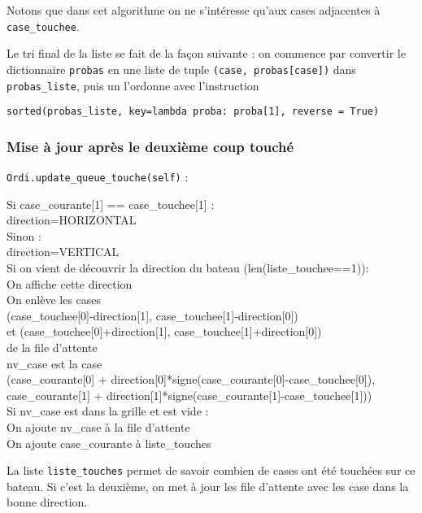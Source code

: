 Notons que dans cet algorithme on ne s'intéresse qu'aux cases adjacentes à \texttt{case\_touchee}.

\medskip

Le tri final de la liste se fait de la façon suivante : on commence par convertir le dictionnaire \texttt{probas} en une liste de tuple \texttt{(case, probas[case])} dans \texttt{probas\_liste}, puis un l'ordonne avec l'instruction
\begin{center}
\texttt{sorted(probas\_liste, key=lambda proba: proba[1], reverse = True)}
\end{center}

\newpage
\subsubsection{Mise à jour après le deuxième coup touché}\label{update_queue_touche}
\texttt{Ordi.update\_queue\_touche(self)} :
\begin{algo1}
Si case\_courante[1] == case\_touchee[1] :\\
direction=HORIZONTAL\\
Sinon :\\
direction=VERTICAL\\
Si on vient de découvrir la direction du bateau (len(liste\_touchee==1)):\\
On affiche cette direction\\
On enlève les cases \\
 (case\_touchee[0]-direction[1], case\_touchee[1]-direction[0])\\ 
et (case\_touchee[0]+direction[1], case\_touchee[1]+direction[0])\\
de la file d'attente\\
nv\_case est la case\\
(case\_courante[0] + direction[0]*signe(case\_courante[0]-case\_touchee[0]),\\
 case\_courante[1] + direction[1]*signe(case\_courante[1]-case\_touchee[1]))\\
Si nv\_case est dans la grille et est vide :\\
On ajoute nv\_case à la file d'attente\\
On ajoute case\_courante à liste\_touches\\
\end{algo1}

La liste \texttt{liste\_touches} permet de savoir combien de cases ont été touchées sur ce bateau. Si c'est la deuxième, on met à jour les file d'attente avec les case dans la bonne direction.


